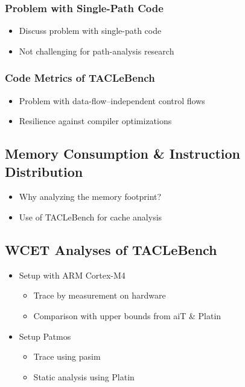 \documentclass[a4paper,USenglish]{lites}
\begin{document}
\subsubsection*{Problem with Single-Path Code}

\begin{itemize}
  \item Discuss problem with single-path code
  \item Not challenging for path-analysis research
\end{itemize}

\subsubsection*{Code Metrics of TACLeBench}
\begin{itemize}
  \item Problem with data-flow--independent control flows
  \item Resilience against compiler optimizations
\end{itemize}

\subsection{Memory Consumption \& Instruction Distribution}
\label{subsec:memory-consumption}
\begin{itemize}
  \item Why analyzing the memory footprint?
  \item Use of TACLeBench for cache analysis
\end{itemize}


\subsection{WCET Analyses of TACLeBench}
\label{subsec:wcet-analysis}

\begin{itemize}
  \item Setup with ARM Cortex-M4
  \begin{itemize}
    \item Trace by measurement on hardware
    \item Comparison with upper bounds from aiT \& Platin~\cite{puschner:2013:seus} %
  \end{itemize}
  \item Setup Patmos~\cite{schoeberl:2015:jsa}
  \begin{itemize}
    \item Trace using pasim
    \item Static analysis using Platin
  \end{itemize}
\end{itemize}
\end{document}
